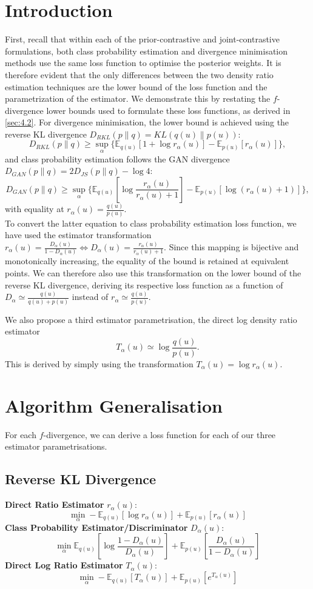 \documentclass[honours,12pt]{unswthesis}
\numberwithin{equation}{section}
\theoremstyle{definition}
\begin{document}
\section{Introduction}\label{sec:5.1}
First, recall that within each of the prior-contrastive and joint-contrastive formulations, both class probability estimation and divergence minimisation methods use the same loss function to optimise the posterior weights. It is therefore evident that the only differences between the two density ratio estimation techniques are the lower bound of the loss function and the parametrization of the estimator. We demonstrate this by restating the $f$-divergence lower bounds used to formulate these loss functions, as derived in \autoref{sec:4.2}. For divergence minimisation, the lower bound is achieved using the reverse KL divergence $D_{RKL}(p\|q)=KL(q(u)\|p(u))$:
\[D_{RKL}(p\|q)\geq \sup_{\alpha}\{\mathbb{E}_{q(u)}[1+\log r_\alpha(u)]-\mathbb{E}_{p(u)}[r_\alpha(u)]\},\]
and class probability estimation follows the GAN divergence $D_{GAN}(p\|q)=2D_{JS}(p\|q)-\log 4$:
\[D_{GAN}(p\|q)\geq \sup_\alpha\{\mathbb{E}_{q(u)}\left[\log \frac{r_\alpha(u)}{r_\alpha(u)+1}\right]-\mathbb{E}_{p(u)}[\log(r_\alpha(u)+1)]\},\]
with equality at $r_\alpha(u)=\frac{q(u)}{p(u)}$.\\
To convert the latter equation to class probability estimation loss function, we have used the estimator transformation $r_\alpha(u)=\frac{D_\alpha(u)}{1-D_\alpha(u)}\iff D_\alpha(u)=\frac{r_\alpha(u)}{r_\alpha(u)+1}$. Since this mapping is bijective and monotonically increasing, the equality of the bound is retained at equivalent points. We can therefore also use this transformation on the lower bound of the reverse KL divergence, deriving its respective loss function as a function of $D_\alpha\simeq \frac{q(u)}{q(u)+p(u)}$ instead of $r_\alpha\simeq \frac{q(u)}{p(u)}$.

We also propose a third estimator parametrisation, the direct log density ratio estimator
\[T_\alpha(u)\simeq \log \frac{q(u)}{p(u)}.\]
This is derived by simply using the transformation $T_\alpha(u)=\log r_\alpha(u)$.
\section{Algorithm Generalisation}
For each $f$-divergence, we can derive a loss function for each of our three estimator parametrisations.
\subsection{Reverse KL Divergence}
\textbf{Direct Ratio Estimator} $r_\alpha(u)$:
\[\min_\alpha -\mathbb{E}_{q(u)}[\log r_\alpha(u)]+\mathbb{E}_{p(u)}[r_\alpha(u)]\]
\textbf{Class Probability Estimator/Discriminator} $D_\alpha(u)$:
\[\min_\alpha \mathbb{E}_{q(u)}\left[\log \frac{1-D_\alpha(u)}{D_\alpha(u)}\right]+\mathbb{E}_{p(u)}\left[\frac{D_\alpha(u)}{1-D_\alpha(u)}\right]\]
\textbf{Direct Log Ratio Estimator} $T_\alpha(u)$:
\[\min_\alpha -\mathbb{E}_{q(u)}[T_\alpha(u)]+\mathbb{E}_{p(u)}[e^{T_\alpha (u)}]\]
\end{document}

